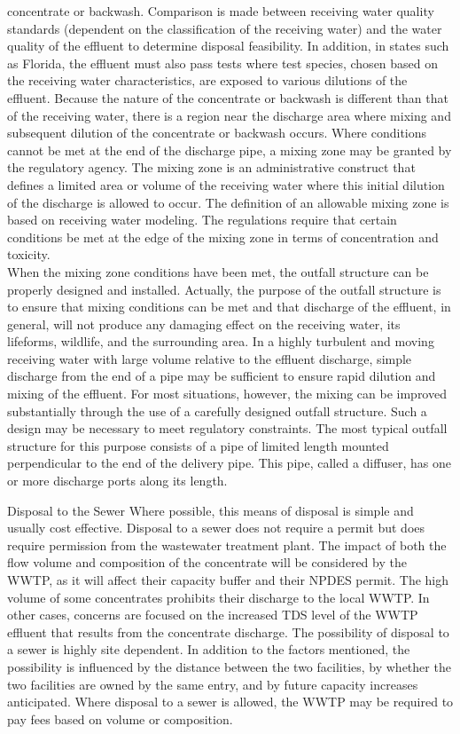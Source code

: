\documentclass{article}
\begin{document}
concentrate or backwash. Comparison is made between receiving water
quality standards (dependent on the classification of the receiving
water) and the water quality of the effluent to determine disposal
feasibility. In addition, in states such as Florida, the effluent must
also pass tests where test species, chosen based on the receiving water
characteristics, are exposed to various dilutions of the effluent.
Because the nature of the concentrate or backwash is different than that
of the receiving water, there is a region near the discharge area where
mixing and subsequent dilution of the concentrate or backwash occurs.
Where conditions cannot be met at the end of the discharge pipe, a
mixing zone may be granted by the regulatory agency. The mixing zone is
an administrative construct that defines a limited area or volume of the
receiving water where this initial dilution of the discharge is allowed
to occur. The definition of an allowable mixing zone is based on
receiving water modeling. The regulations require that certain
conditions be met at the edge of the mixing zone in terms of
concentration and toxicity.\\
When the mixing zone conditions have been met, the outfall structure can
be properly designed and installed. Actually, the purpose of the outfall
structure is to ensure that mixing conditions can be met and that
discharge of the effluent, in general, will not produce any damaging
effect on the receiving water, its lifeforms, wildlife, and the
surrounding area. In a highly turbulent and moving receiving water with
large volume relative to the effluent discharge, simple discharge from
the end of a pipe may be sufficient to ensure rapid dilution and mixing
of the effluent. For most situations, however, the mixing can be
improved substantially through the use of a carefully designed outfall
structure. Such a design may be necessary to meet regulatory
constraints. The most typical outfall structure for this purpose
consists of a pipe of limited length mounted perpendicular to the end of
the delivery pipe. This pipe, called a diffuser, has one or more
discharge ports along its length.

Disposal to the Sewer Where possible, this means of disposal is simple
and usually cost effective. Disposal to a sewer does not require a
permit but does require permission from the wastewater treatment plant.
The impact of both the flow volume and composition of the concentrate
will be considered by the WWTP, as it will affect their capacity buffer
and their NPDES permit. The high volume of some concentrates prohibits
their discharge to the local WWTP. In other cases, concerns are focused
on the increased TDS level of the WWTP effluent that results from the
concentrate discharge. The possibility of disposal to a sewer is highly
site dependent. In addition to the factors mentioned, the possibility is
influenced by the distance between the two facilities, by whether the
two facilities are owned by the same entry, and by future capacity
increases anticipated. Where disposal to a sewer is allowed, the WWTP
may be required to pay fees based on volume or composition.
\end{document}
